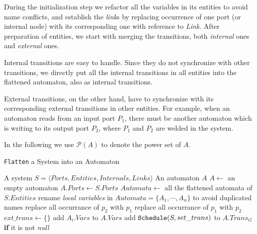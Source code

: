 During the initialization step we refactor all the variables in its entities to avoid name conflicts, and establish the \emph{link}s by replacing occurrence of one port (or internal node) with its corresponding one with reference to \emph{Link}. 
After preparation of entities, we start with merging the transitions, both \emph{internal} ones and \emph{external} ones.

Internal transitions are easy to handle. Since they do not synchronize with other transitions, we directly put all the internal transitions in all entities into the flattened automaton, also as internal transitions.

External transitions, on the other hand, have to synchronize with its corresponding external transitions in other entities. For example, when an automaton reads from an input port $P_1$, there must be another automaton which is writing to its output port $P_2$, where $P_1$ and $P_2$ are welded in the system.

In the following we use $\mathcal{P}(A)$ to denote the power set of $A$.

\begin{algorithm}[H]
    \caption{\texttt{Flatten} a System into an Automaton}
    \label{alg:compose}
    \small
    \begin{algorithmic}[1]
        \REQUIRE A system $S=\langle Ports, Entities, Internals, Links\rangle$
        \ENSURE An automaton $A$
        \STATE $A \leftarrow $ an empty automaton
        \STATE $A.Ports\leftarrow S.Ports$
        \STATE $Automata\leftarrow$ all the flattened automata of $S.Entities$
        \STATE rename \emph{local variables} in $Automata=\{A_1,\cdots,A_n\}$ to avoid duplicated names
                \STATE replace all occurrance of $p_2$ with $p_1$
            \ELSE
                \STATE replace all occurrance of $p_1$ with $p_2$
            \ENDIF
        \ENDFOR
        \STATE $ext\_trans\leftarrow \{\}$
            \STATE add $A_i.Vars$ to $A.Vars$
        \ENDFOR
            \STATE add $\mbox{\texttt{Schedule}}(S, set\_trans)$ to $A.Trans_G$ \textbf{if} it is not \emph{null}
        \ENDFOR
    \end{algorithmic}
\end{algorithm}

